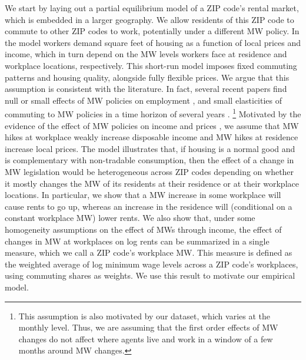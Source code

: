 We start by laying out a partial equilibrium model of a ZIP code's rental market,
which is embedded in a larger geography.
We allow residents of this ZIP code to commute to other ZIP codes to work, 
potentially under a different MW policy.
In the model workers demand square feet of housing as a function of local prices 
and income, which in turn depend on the MW levels workers face at residence and 
workplace locations, respectively.
This short-run model imposes fixed commuting patterns and housing quality, 
alongside fully flexible prices.
We argue that this assumption is consistent with the literature.
In fact, several recent papers find null or small effects of MW policies on 
employment \parencite{CegnizEtAl2019, DustmannEtAl2022}, and 
small elasticities of commuting to MW policies in a time horizon of several 
years \parencite{PerezPerez2021}.%
\footnote{This assumption is also motivated by our dataset, which varies at the 
monthly level. Thus, we are assuming that the first order effects of 
MW changes do not affect where agents live and work in a window of a few months
around MW changes.}
Motivated by the evidence of the effect of MW policies on 
income \parencite{Dube2019Income, CegnizEtAl2019} and 
prices \parencite{AllegrettoReich2018, Leung2021},
we assume that MW hikes at workplace weakly increase disposable income and MW 
hikes at residence increase local prices.
The model illustrates that, if housing is a normal good and is complementary 
with non-tradable consumption, then the effect of a change in MW legislation 
would be heterogeneous across ZIP codes depending on whether it mostly changes 
the MW of its residents at their residence or at their workplace locations.
In particular, we show that a MW increase in some workplace will cause rents to 
go up, whereas an increase in the residence will (conditional on a constant 
workplace MW) lower rents.
We also show that, under some homogeneity assumptions on the effect of MWs 
through income, the effect of changes in MW at workplaces on log rents can be 
summarized in a single measure, which we call a ZIP code's workplace MW.
This measure is defined as the weighted average of log minimum wage levels 
across a ZIP code's workplaces, using commuting shares as weights.
We use this result to motivate our empirical model.


